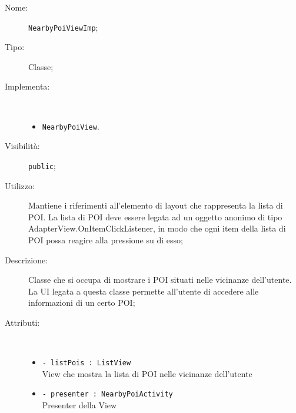 \documentclass[../DefinizioneDiProdotto.tex]{subfiles}
\begin{document}
\begin{description}
	\item[Nome:] \texttt{NearbyPoiViewImp};
	\item[Tipo:] Classe;
	\item[Implementa:] \
	\begin{itemize}
		\item \texttt{NearbyPoiView}.
		
	\end{itemize}
	\item[Visibilità:] \texttt{public};
	\item[Utilizzo:] Mantiene i riferimenti all'elemento di layout che rappresenta la lista di POI. La lista di POI deve essere legata ad un oggetto anonimo di tipo AdapterView.OnItemClickListener, in modo che ogni item della lista di POI possa reagire alla pressione su di esso;
	\item[Descrizione:] Classe che si occupa di mostrare i POI situati nelle vicinanze dell'utente. La UI legata a questa classe permette all'utente di accedere alle informazioni di un certo POI;
	\item[Attributi:] \
	\begin{itemize}
		\item \texttt{- listPois : ListView}\\
		View che mostra la lista di POI nelle vicinanze dell'utente
		
		\item \texttt{- presenter : NearbyPoiActivity}\\
		Presenter della View
		

\end{itemize}
\end{description}
\end{document}
